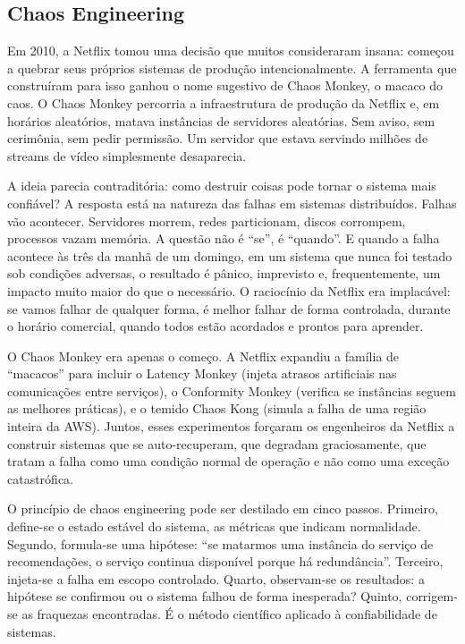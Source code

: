 \subsection{Chaos Engineering}

Em 2010, a Netflix tomou uma decisão que muitos consideraram insana: começou a
quebrar seus próprios sistemas de produção intencionalmente. A ferramenta que
construíram para isso ganhou o nome sugestivo de Chaos Monkey, o macaco do
caos. O Chaos Monkey percorria a infraestrutura de produção da Netflix e, em
horários aleatórios, matava instâncias de servidores aleatórias. Sem aviso, sem
cerimônia, sem pedir permissão. Um servidor que estava servindo milhões de
streams de vídeo simplesmente desaparecia.

A ideia parecia contraditória: como destruir coisas pode tornar o sistema mais
confiável? A resposta está na natureza das falhas em sistemas distribuídos.
Falhas vão acontecer. Servidores morrem, redes particionam, discos corrompem,
processos vazam memória. A questão não é ``se'', é ``quando''. E quando a falha
acontece às três da manhã de um domingo, em um sistema que nunca foi testado sob
condições adversas, o resultado é pânico, imprevisto e, frequentemente, um
impacto muito maior do que o necessário. O raciocínio da Netflix era implacável:
se vamos falhar de qualquer forma, é melhor falhar de forma controlada, durante o
horário comercial, quando todos estão acordados e prontos para aprender.

O Chaos Monkey era apenas o começo. A Netflix expandiu a família de ``macacos''
para incluir o Latency Monkey (injeta atrasos artificiais nas comunicações entre
serviços), o Conformity Monkey (verifica se instâncias seguem as melhores
práticas), e o temido Chaos Kong (simula a falha de uma região inteira da AWS).
Juntos, esses experimentos forçaram os engenheiros da Netflix a construir
sistemas que se auto-recuperam, que degradam graciosamente, que tratam a falha
como uma condição normal de operação e não como uma exceção catastrófica.

O princípio de chaos engineering pode ser destilado em cinco passos.
Primeiro, define-se o estado estável do sistema, as métricas que indicam
normalidade. Segundo, formula-se uma hipótese: ``se matarmos uma instância do
serviço de recomendações, o serviço continua disponível porque há redundância''.
Terceiro, injeta-se a falha em escopo controlado. Quarto, observam-se os
resultados: a hipótese se confirmou ou o sistema falhou de forma inesperada?
Quinto, corrigem-se as fraquezas encontradas. É o método científico aplicado à
confiabilidade de sistemas.

